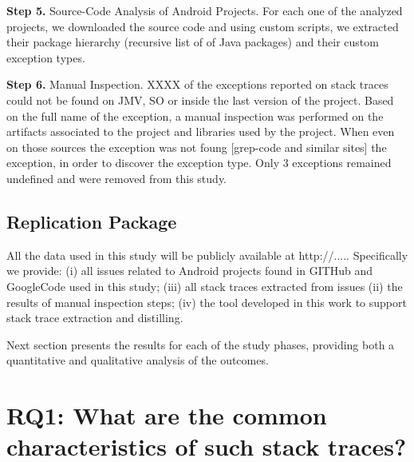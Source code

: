 \documentclass[conference]{IEEEtran}
\begin{document}
\textbf{Step 5.}  Source-Code Analysis of Android Projects. 
For each one of the analyzed projects, we
downloaded the source code and using custom scripts, we extracted their package
hierarchy (recursive list of of Java packages) and their custom exception types.

\textbf{Step 6.}  Manual Inspection. XXXX of the exceptions reported on stack traces  could not be found on JMV, SO or inside the last version of the project. Based on the full name of the exception, a manual inspection was performed on the artifacts associated to the project and libraries used by the project. When even on those sources the exception was not foung [grep-code and similar sites] the exception, in order to discover the exception type. Only 3 exceptions remained undefined and were removed from this study.

\subsection{Replication Package}
All the data used in this study will be publicly available at http://.....
Specifically we provide: (i) all issues related to Android projects found
in GITHub and GoogleCode used in this study; (iii) all stack traces extracted
from issues (ii) the results of manual inspection steps; (iv) the tool developed 
in this work to support stack trace extraction and distilling.

Next section presents the results for each of the study phases, providing both a
quantitative and qualitative analysis of the outcomes.

\section{RQ1: What are the common characteristics of such stack traces?}

\end{document}
